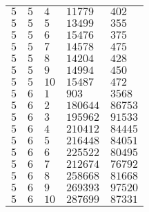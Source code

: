 \begin{table}[ht]
\begin{tabular}{l|l|l|l|l}
$5$ & $5$ & $4$ & $11779$ & $402$\\
$5$ & $5$ & $5$ & $13499$ & $355$\\
$5$ & $5$ & $6$ & $15476$ & $375$\\
$5$ & $5$ & $7$ & $14578$ & $475$\\
$5$ & $5$ & $8$ & $14204$ & $428$\\
$5$ & $5$ & $9$ & $14994$ & $450$\\
$5$ & $5$ & $10$ & $15487$ & $472$\\
$5$ & $6$ & $1$ & $903$ & $3568$\\
$5$ & $6$ & $2$ & $180644$ & $86753$\\
$5$ & $6$ & $3$ & $195962$ & $91533$\\
$5$ & $6$ & $4$ & $210412$ & $84445$\\
$5$ & $6$ & $5$ & $216448$ & $84051$\\
$5$ & $6$ & $6$ & $225522$ & $80495$\\
$5$ & $6$ & $7$ & $212674$ & $76792$\\
$5$ & $6$ & $8$ & $258668$ & $81668$\\
$5$ & $6$ & $9$ & $269393$ & $97520$\\
$5$ & $6$ & $10$ & $287699$ & $87331$
\end{tabular}
\end{table}

\onecolumn
